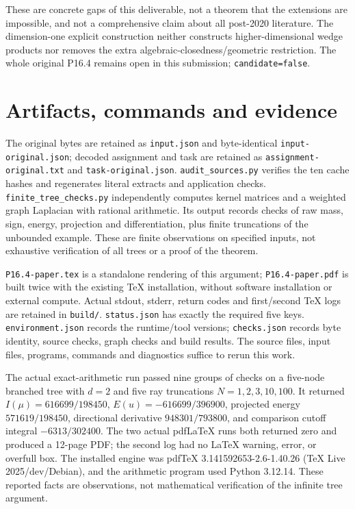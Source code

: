 \documentclass[
  11pt,
]{article}
\begin{document}
These are concrete gaps of this deliverable, not a theorem that the
extensions are impossible, and not a comprehensive claim about all
post-2020 literature. The dimension-one explicit construction neither
constructs higher-dimensional wedge products nor removes the extra
algebraic-closedness/geometric restriction. The whole original P16.4
remains open in this submission; \texttt{candidate=false}.

\section{Artifacts, commands and
evidence}\label{artifacts-commands-and-evidence}

The original bytes are retained as \texttt{input.json} and
byte-identical \texttt{input-original.json}; decoded assignment and task
are retained as \texttt{assignment-original.txt} and
\texttt{task-original.json}. \texttt{audit\_sources.py} verifies the ten
cache hashes and regenerates literal extracts and application checks.
\texttt{finite\_tree\_checks.py} independently computes kernel matrices
and a weighted graph Laplacian with rational arithmetic. Its output
records checks of raw mass, sign, energy, projection and
differentiation, plus finite truncations of the unbounded example. These
are finite observations on specified inputs, not exhaustive verification
of all trees or a proof of the theorem.

\texttt{P16.4-paper.tex} is a standalone rendering of this argument;
\texttt{P16.4-paper.pdf} is built twice with the existing TeX
installation, without software installation or external compute. Actual
stdout, stderr, return codes and first/second TeX logs are retained in
\texttt{build/}. \texttt{status.json} has exactly the required five
keys. \texttt{environment.json} records the runtime/tool versions;
\texttt{checks.json} records byte identity, source checks, graph checks
and build results. The source files, input files, programs, commands and
diagnostics suffice to rerun this work.

The actual exact-arithmetic run passed nine groups of checks on a
five-node branched tree with \(d=2\) and five ray truncations
\(N=1,2,3,10,100\). It returned \(I(\mu)=616699/198450\),
\(E(u)=-616699/396900\), projected energy \(571619/198450\), directional
derivative \(948301/793800\), and comparison cutoff integral
\(-6313/302400\). The two actual pdfLaTeX runs both returned zero and
produced a 12-page PDF; the second log had no LaTeX warning, error, or
overfull box. The installed engine was pdfTeX 3.141592653-2.6-1.40.26
(TeX Live 2025/dev/Debian), and the arithmetic program used Python
3.12.14. These reported facts are observations, not mathematical
verification of the infinite tree argument.
\end{document}
